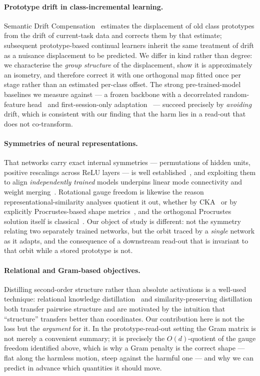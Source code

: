 \paragraph{Prototype drift in class-incremental learning.}
Semantic Drift Compensation~\citep{yu2020sdc} estimates the displacement of old
class prototypes from the drift of current-task data and corrects them by that
estimate; subsequent prototype-based continual learners inherit the same
treatment of drift as a nuisance displacement to be predicted. We differ in
kind rather than degree: we characterise the \emph{group structure} of the
displacement, show it is approximately an isometry, and therefore correct it with
one orthogonal map fitted once per stage rather than an estimated per-class
offset. The strong pre-trained-model baselines we measure against --- a frozen
backbone with a decorrelated random-feature head~\citep{mcdonnell2023ranpac} and
first-session-only adaptation~\citep{zhou2024revisiting} --- succeed precisely by
\emph{avoiding} drift, which is consistent with our finding that the harm lies in
a read-out that does not co-transform.

\paragraph{Symmetries of neural representations.}
That networks carry exact internal symmetries --- permutations of hidden units,
positive rescalings across ReLU layers --- is well
established~\citep{godfrey2022symmetries}, and exploiting them to align
\emph{independently trained} models underpins linear mode connectivity and
weight merging~\citep{entezari2022permutation,ainsworth2023rebasin}. Rotational
gauge freedom is likewise the reason representational-similarity analyses quotient
it out, whether by CKA~\citep{kornblith2019similarity} or by explicitly
Procrustes-based shape metrics~\citep{williams2021shape}, and the orthogonal
Procrustes solution itself is classical~\citep{schonemann1966procrustes}. Our
object of study is different: not the symmetry relating two separately trained
networks, but the orbit traced by a \emph{single} network as it adapts, and the
consequence of a downstream read-out that is invariant to that orbit while a
stored prototype is not.

\paragraph{Relational and Gram-based objectives.}
Distilling second-order structure rather than absolute activations is a
well-used technique: relational knowledge
distillation~\citep{park2019rkd} and similarity-preserving
distillation~\citep{tung2019similarity} both transfer pairwise structure and are
motivated by the intuition that ``structure'' transfers better than coordinates.
Our contribution here is not the loss but the \emph{argument} for it. In the
prototype-read-out setting the Gram matrix is not merely a convenient summary; it
is precisely the $O(d)$-quotient of the gauge freedom identified above, which is
why a Gram penalty is the correct shape --- flat along the harmless motion, steep
against the harmful one --- and why we can predict in advance which quantities it
should move.

